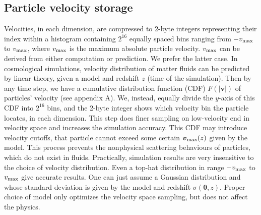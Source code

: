 \documentclass[10pt,twocolumn,preprint]{emulateapj}
\newcommand{\bs}{\boldsymbol}
\begin{document}
\subsection{Particle velocity storage}\label{s.velocity}
Velocities, in each dimension, are compressed to 2-byte integers representing their index within a histogram containing $2^{16}$ equally spaced bins ranging from $-v_{\rm max}$ to $v_{\rm max}$, where $v_{\rm max}$ is the maximum absolute particle velocity. $v_{\rm max}$ can be derived from either computation or prediction. We prefer the latter case. In cosmological simulations, velocity distribution of matter fluids can be predicted by linear theory, given a model and redshift $z$ (time of the simulation). Then by any time step, we have a cumulative distribution function (CDF) $F(|\bs{v}|)$ of particles' velocity (see appendix A). We, instead, equally divide the $y$-axis of this CDF into $2^{16}$ bins, and the 2-byte integer shows which velocity bin the particle locates, in each dimension. This step does finer sampling on low-velocity end in velocity space and increases the simulation accuracy. This CDF may introduce velocity cutoffs, that particle cannot exceed some certain $\bs{v}_{\rm max}(z)$ given by the model. This process prevents the nonphysical scattering behaviours of particles, which do not exist in fluids. Practically, simulation results are very insensitive to the choice of velocity distribution. Even a top-hat distribution in range $-v_{\rm max}$ to $v_{\rm max}$ give accurate results. One can just assume a Gaussian distribution and whose standard deviation is given by the model and redshift $\sigma(\bs{\theta},z)$. Proper choice of model only optimizes the velocity space sampling, but does not affect the physics.
\end{document}
